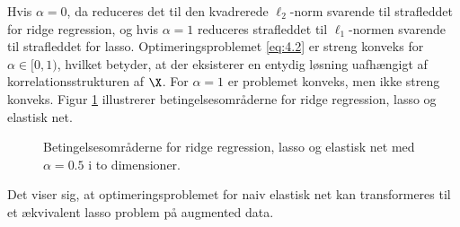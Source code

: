 Hvis $\alpha=0$, da reduceres det til den kvadrerede $\ell_2$-norm svarende til strafleddet for ridge regression, og hvis $\alpha=1$ reduceres strafleddet til $\ell_1$-normen svarende til strafleddet for lasso.
Optimeringsproblemet  \eqref{eq:4.2} er streng konveks for \(\alpha \in [0,1)\), hvilket betyder, at der eksisterer en entydig løsning uafhængigt af korrelationsstrukturen af $\X$.
For  \(\alpha=1\) er problemet konveks, men ikke streng konveks.
Figur \ref{fig:elastisk} illustrerer betingelsesområderne for ridge regression, lasso og elastisk net.
%
\begin{figure}[H]
\centering
\scalebox{0.8}{}
\caption{Betingelsesområderne for ridge regression, lasso og elastisk net med \(\alpha = 0.5\) i to dimensioner.} \label{fig:elastisk}
\end{figure}
%
%
%
%
Det viser sig, at optimeringsproblemet for naiv elastisk net kan transformeres til et ækvivalent lasso problem på augmented data.
